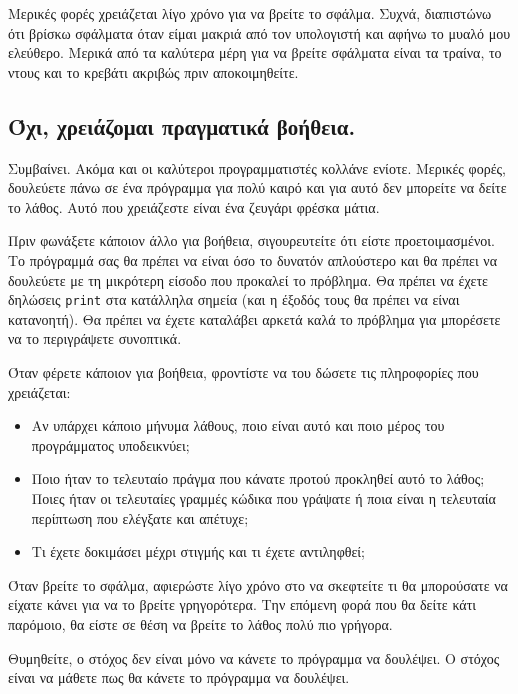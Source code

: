 \documentclass[10pt]{book}
\begin{document}
Μερικές φορές χρειάζεται λίγο χρόνο για να βρείτε το σφάλμα. Συχνά, διαπιστώνω ότι βρίσκω σφάλματα
όταν είμαι μακριά από τον υπολογιστή και αφήνω το μυαλό μου ελεύθερο.  Μερικά από τα καλύτερα μέρη
για να βρείτε σφάλματα είναι τα τραίνα, το ντους και το κρεβάτι ακριβώς πριν αποκοιμηθείτε.


\subsection{Όχι, χρειάζομαι πραγματικά βοήθεια.}

Συμβαίνει.  Ακόμα και οι καλύτεροι προγραμματιστές κολλάνε ενίοτε.  
Μερικές φορές, δουλεύετε πάνω σε ένα πρόγραμμα για πολύ καιρό και για αυτό δεν 
μπορείτε να δείτε το λάθος.  Αυτό που χρειάζεστε είναι ένα ζευγάρι φρέσκα μάτια.

Πριν φωνάξετε κάποιον άλλο για βοήθεια, σιγουρευτείτε ότι είστε προετοιμασμένοι. 
Το πρόγραμμά σας θα πρέπει να είναι όσο το δυνατόν απλούστερο και θα πρέπει να δουλεύετε με τη
μικρότερη είσοδο που προκαλεί το πρόβλημα.  Θα πρέπει να έχετε δηλώσεις {\tt print} στα κατάλληλα
σημεία (και η έξοδός τους θα πρέπει να είναι κατανοητή).  Θα πρέπει να έχετε καταλάβει αρκετά καλά
το πρόβλημα για μπορέσετε να το περιγράψετε συνοπτικά.

Όταν φέρετε κάποιον για βοήθεια, φροντίστε να του δώσετε τις πληροφορίες που 
χρειάζεται: 

\begin{itemize}

\item Αν υπάρχει κάποιο μήνυμα λάθους, ποιο είναι αυτό και ποιο μέρος 
του προγράμματος υποδεικνύει; 

\item  Ποιο ήταν το τελευταίο πράγμα που κάνατε προτού προκληθεί αυτό το λάθος; Ποιες ήταν οι
τελευταίες γραμμές κώδικα που γράψατε ή ποια είναι η τελευταία περίπτωση που ελέγξατε και απέτυχε; 

\item Τι έχετε δοκιμάσει μέχρι στιγμής και τι έχετε αντιληφθεί; 

\end{itemize}

Όταν βρείτε το σφάλμα, αφιερώστε λίγο χρόνο στο να σκεφτείτε τι θα μπορούσατε να είχατε κάνει για να το
βρείτε γρηγορότερα.  Την επόμενη φορά που θα δείτε κάτι παρόμοιο, θα είστε σε θέση να βρείτε το λάθος
πολύ πιο γρήγορα.

Θυμηθείτε, ο στόχος δεν είναι μόνο να κάνετε το πρόγραμμα να δουλέψει. Ο στόχος είναι να μάθετε πως θα
κάνετε το πρόγραμμα να δουλέψει.
\end{document}
